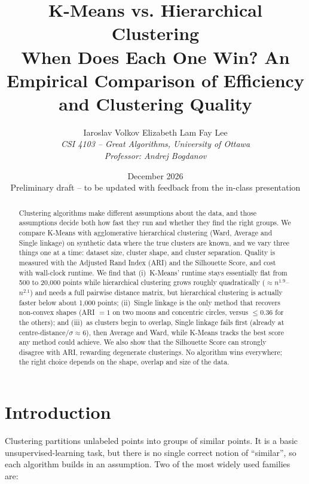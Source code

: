 \documentclass[11pt,letterpaper]{article}
\title{
    \textbf{K-Means vs. Hierarchical Clustering}\\
    \large When Does Each One Win? An Empirical Comparison of
    Efficiency and Clustering Quality
}
\author{
    Iaroslav Volkov \quad Elizabeth Lam \quad Fay Lee \\[4pt]
    \textit{CSI 4103 -- Great Algorithms, University of Ottawa} \\
    \textit{Professor: Andrej Bogdanov}
}
\date{December 2026\\[2pt]\small Preliminary draft -- to be updated with
feedback from the in-class presentation}
\begin{document}
\maketitle

\begin{abstract}
\noindent
Clustering algorithms make different assumptions about the data, and those
assumptions decide both how fast they run and whether they find the right
groups. We compare K-Means with agglomerative hierarchical clustering
(Ward, Average and Single linkage) on synthetic data where the true
clusters are known, and we vary three things one at a time: dataset size,
cluster shape, and cluster separation. Quality is measured with the Adjusted
Rand Index (ARI) and the Silhouette Score, and cost with wall-clock
runtime. We find that (i)~K-Means' runtime stays essentially flat from 500
to 20{,}000 points while hierarchical clustering grows roughly
quadratically ($\approx n^{1.9}$--$n^{2.1}$) and needs a full pairwise
distance matrix, but hierarchical clustering is actually faster below about
1{,}000 points; (ii)~Single linkage is the only method that recovers
non-convex shapes (ARI $=1$ on two moons and concentric circles, versus
$\le 0.36$ for the others); and (iii)~as clusters begin to overlap,
Single linkage fails first (already at centre-distance$/\sigma\approx 6$),
then Average and Ward, while K-Means tracks the best score any method could
achieve. We also show that the Silhouette Score can strongly disagree with
ARI, rewarding degenerate clusterings. No algorithm wins everywhere; the
right choice depends on the shape, overlap and size of the data.
\end{abstract}

\section{Introduction}

Clustering partitions unlabeled points into groups of similar points. It is
a basic unsupervised-learning task, but there is no single correct notion of
``similar'', so each algorithm builds in an assumption. Two of the most widely
used families are:
\end{document}
